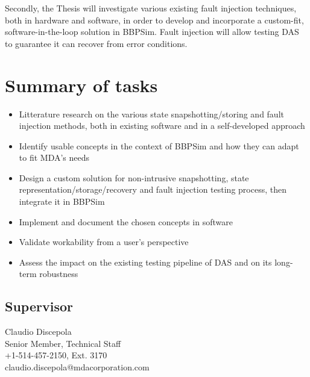 \documentclass[12pt,english]{rftthesis}
\begin{document}
Secondly, the Thesis will investigate various existing fault injection techniques, both in hardware and software, in order to develop and incorporate a custom-fit, software-in-the-loop solution in BBPSim. Fault injection will allow testing DAS to guarantee it can recover from error conditions.
%
%
\section*{Summary of tasks}\label{sec:tasks}
\begin{itemize}
\item Litterature research on the various state snapshotting/storing and fault injection methods, both in existing software and in a self-developed approach
\item Identify usable concepts in the context of BBPSim and how they can adapt to fit MDA's needs 
\item Design a custom solution for non-intrusive snapshotting, state representation/storage/recovery and fault injection testing process, then integrate it in BBPSim
\item Implement and document the chosen concepts in software
\item Validate workability from a user's perspective
\item Assess the impact on the existing testing pipeline of DAS and on its long-term robustness
\end{itemize}

\subsection*{Supervisor}
\begin{spacing}{1}
Claudio Discepola\\
Senior Member, Technical Staff\\
+1-514-457-2150, Ext. 3170\\
claudio.discepola@mdacorporation.com
\end{spacing}
\end{document}
